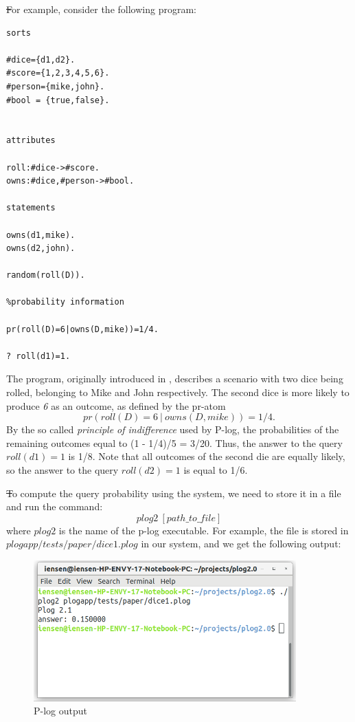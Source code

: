\documentclass[12pt, letterpaper]{article}
\begin{document}
\st
For example, consider the following program:
\begin{verbatim}
sorts

#dice={d1,d2}.
#score={1,2,3,4,5,6}.
#person={mike,john}.
#bool = {true,false}.


attributes

roll:#dice->#score.
owns:#dice,#person->#bool.

statements

owns(d1,mike).
owns(d2,john).

random(roll(D)).

%probability information

pr(roll(D)=6|owns(D,mike))=1/4.

? roll(d1)=1.
\end{verbatim}


The program, originally introduced in \cite{gelfond2014knowledge}, describes a scenario with two dice being rolled, belonging to Mike and John respectively.
The second dice is more likely to produce \textit{6} as an outcome, as defined by the pr-atom
$$pr(roll(D)=6~|~owns(D,mike))=1/4.$$
By the so called \textit{principle of indifference} used by P-log, the probabilities of the remaining outcomes equal to (1 - 1/4)/5 = 3/20.
Thus, the answer to the query $roll(d1)=1$ is 1/8. Note that all outcomes of the second die are equally likely, so the answer to the query $roll(d2)=1$ is equal to 1/6.


\st
To compute the query probability using the system, we need to store it in a file and run the command:
$$plog2~[path\_to\_file]$$
where $plog2$ is the name of the p-log executable. For example, the file is stored in $plogapp/tests/paper/dice1.plog$ in our system, and we get the following output:

\begin{figure}[ht]
\centering
\includegraphics[width=0.9\textwidth]{plog_output.png}
\caption{P-log output}
\label{fig:plog_output}
\end{figure}
\end{document}
